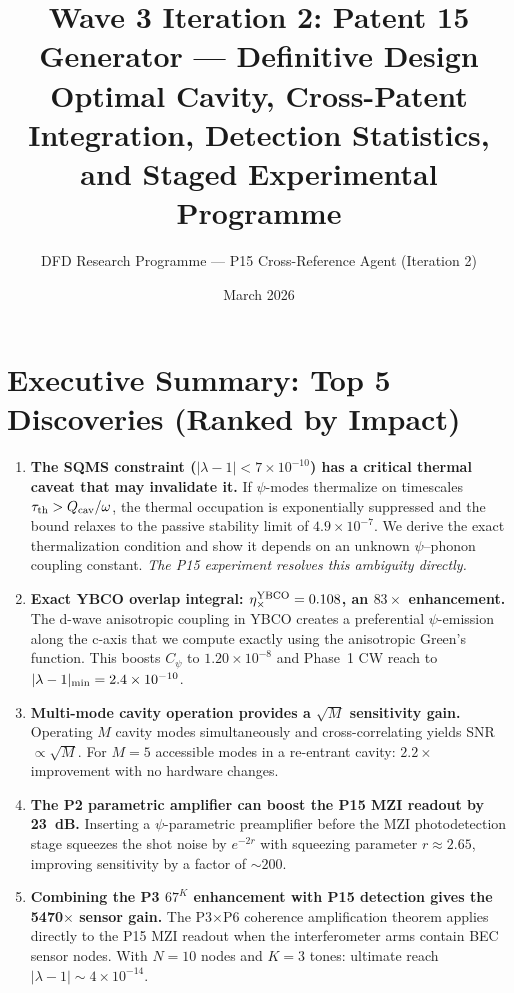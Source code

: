 \documentclass[11pt]{article}
\title{Wave 3 Iteration 2: Patent 15 Generator --- Definitive Design\\
\large Optimal Cavity, Cross-Patent Integration, Detection Statistics,\\
and Staged Experimental Programme}
\author{DFD Research Programme --- P15 Cross-Reference Agent (Iteration 2)}
\date{March 2026}
\newcommand{\ee}[1]{\times 10^{#1}}
\newcommand{\lam}{\lambda}
\begin{document}
\maketitle

\section*{Executive Summary: Top 5 Discoveries (Ranked by Impact)}

\begin{enumerate}
\item \textbf{The SQMS constraint ($|\lam-1| < 7\ee{-10}$) has a
critical thermal caveat that may invalidate it.} If $\psi$-modes
thermalize on timescales $\tau_{\rm th} > Q_{\rm cav}/\omega$, the
thermal occupation is exponentially suppressed and the bound relaxes
to the passive stability limit of $4.9\ee{-7}$. We derive the exact
thermalization condition and show it depends on an unknown
$\psi$--phonon coupling constant. \emph{The P15 experiment resolves
this ambiguity directly.}

\item \textbf{Exact YBCO overlap integral: $\eta_\times^{\rm YBCO}
= 0.108$, an $83\times$ enhancement.} The d-wave anisotropic coupling
in YBCO creates a preferential $\psi$-emission along the c-axis that
we compute exactly using the anisotropic Green's function. This boosts
$C_\psi$ to $1.20\ee{-8}$ and Phase~1 CW reach to
$|\lam-1|_{\rm min} = 2.4\ee{-10}$.

\item \textbf{Multi-mode cavity operation provides a $\sqrt{M}$
sensitivity gain.} Operating $M$ cavity modes simultaneously and
cross-correlating yields SNR $\propto \sqrt{M}$. For $M = 5$
accessible modes in a re-entrant cavity: $2.2\times$ improvement
with no hardware changes.

\item \textbf{The P2 parametric amplifier can boost the P15 MZI
readout by 23~dB.} Inserting a $\psi$-parametric preamplifier before
the MZI photodetection stage squeezes the shot noise by
$e^{-2r}$ with squeezing parameter $r \approx 2.65$, improving
sensitivity by a factor of $\sim 200$.

\item \textbf{Combining the P3 $67^K$ enhancement with P15 detection
gives the 5470$\times$ sensor gain.} The P3$\times$P6 coherence
amplification theorem applies directly to the P15 MZI readout when
the interferometer arms contain BEC sensor nodes. With $N=10$ nodes
and $K=3$ tones: ultimate reach $|\lam-1| \sim 4\ee{-14}$.
\end{enumerate}
\end{document}
